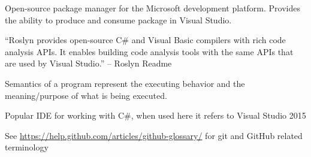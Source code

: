 \documentclass[draftclsnofoot,onecolumn]{IEEEtran}
\begin{document}
\begin{description}
\item[NuGet Package:] Open-source package manager for the Microsoft 
development platform. Provides the ability to produce and consume package in 
Visual Studio.

\item[Roslyn:] “Roslyn provides open-source C\# and Visual Basic compilers 
with rich code analysis APIs. It enables building code analysis tools with 
the same APIs that are used by Visual Studio.” – Roslyn Readme 

\item[Semantics:] Semantics of a program represent the executing behavior and 
the meaning/purpose of what is being executed. 

\item[VS:] Popular IDE for working with C\#, when used here it refers to 
Visual Studio 2015

\end{description}

See \url{https://help.github.com/articles/github-glossary/} for git and 
GitHub related terminology
\end{document}
